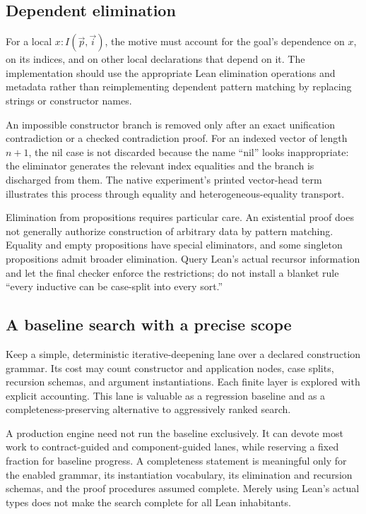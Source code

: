 \documentclass[11pt,letterpaper]{article}
\theoremstyle{definition}
\theoremstyle{remark}
\begin{document}
\subsection{Dependent elimination}

For a local $x:I(\vec p,\vec i)$, the motive must account for the goal's dependence on $x$, on its indices, and on other local declarations that depend on it. The implementation should use the appropriate Lean elimination operations and metadata rather than reimplementing dependent pattern matching by replacing strings or constructor names.

An impossible constructor branch is removed only after an exact unification contradiction or a checked contradiction proof. For an indexed vector of length $n+1$, the nil case is not discarded because the name ``nil'' looks inappropriate: the eliminator generates the relevant index equalities and the branch is discharged from them. The native experiment's printed vector-head term illustrates this process through equality and heterogeneous-equality transport.

Elimination from propositions requires particular care. An existential proof does not generally authorize construction of arbitrary data by pattern matching. Equality and empty propositions have special eliminators, and some singleton propositions admit broader elimination. Query Lean's actual recursor information and let the final checker enforce the restrictions; do not install a blanket rule ``every inductive can be case-split into every sort.''

\subsection{A baseline search with a precise scope}

Keep a simple, deterministic iterative-deepening lane over a declared construction grammar. Its cost may count constructor and application nodes, case splits, recursion schemas, and argument instantiations. Each finite layer is explored with explicit accounting. This lane is valuable as a regression baseline and as a completeness-preserving alternative to aggressively ranked search.

A production engine need not run the baseline exclusively. It can devote most work to contract-guided and component-guided lanes, while reserving a fixed fraction for baseline progress. A completeness statement is meaningful only for the enabled grammar, its instantiation vocabulary, its elimination and recursion schemas, and the proof procedures assumed complete. Merely using Lean's actual types does not make the search complete for all Lean inhabitants.
\end{document}
